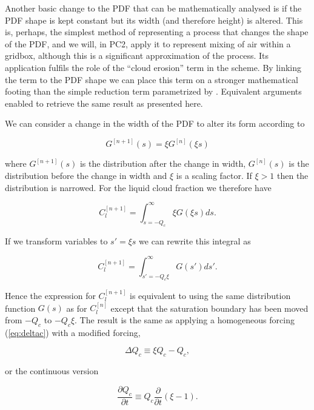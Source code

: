 \documentclass{UMDP_article}
\begin{document}
Another basic change to the PDF that can be mathematically analysed
is if the PDF shape is kept constant but its width (and therefore height)
is altered. This is, perhaps, the simplest method of representing a process
that changes the shape of the PDF, and we will, in PC2, apply it to represent
mixing of air within a gridbox, although this is a significant approximation
of the process. Its application fulfils the role of the ``cloud erosion'' term
in the \cite{t93} scheme. By linking the term to the PDF shape we can
place this term on a stronger mathematical footing than the simple reduction
term parametrized by \cite{t93}. Equivalent arguments enabled \cite{ww99} 
to retrieve the same result as presented here.

We can consider a change in the width of the PDF to alter its form
according to

\begin{equation}
G^{[n+1]}(s) = \xi G^{[n]} (\xi s)
\label{eq:g_xi}
\end{equation}

where $G^{[n+1]}(s)$ is the distribution after the change in width,
$G^{[n]} (s)$ is the distribution before the change in width and $\xi$ is
a scaling factor. If $\xi > 1$ then the distribution is narrowed.
For the liquid cloud fraction we therefore have

\begin{equation}
C_l^{[n+1]} = \int_{s=-Q_c}^{\infty} \xi G(\xi s) ds .
\label{eq:c_l_xi}
\end{equation}

If we transform variables to $s' = \xi s$ we can rewrite this integral as

\begin{equation}
C_l^{[n+1]} = \int_{s'=-Q_c \xi}^{\infty} G(s') ds' .
\label{eq:c_l_xi2}
\end{equation}

Hence the expression for $C_l^{[n+1]}$ is equivalent to using the same
distribution function $G(s)$ as for $C_l^{[n]}$ except that the saturation
boundary has been moved from $-Q_c$ to $-Q_c \xi$. The result is the same as applying
a homogeneous forcing (\ref{eq:deltac}) with a modified forcing,

\begin{equation}
\Delta Q_c \equiv \xi Q_c - Q_c ,
\label{eq:deltac_modified}
\end{equation}

or the continuous version

\begin{equation}
\frac{\partial Q_c}{\partial t} \equiv
Q_c \frac{\partial}{\partial t}(\xi - 1) .
\label{eq:xi_equiv}
\end{equation}
\end{document}
